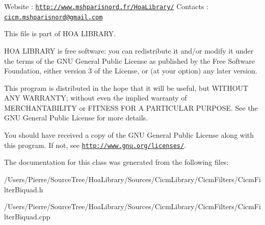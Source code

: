 Website \-: \href{http://www.mshparisnord.fr/HoaLibrary/}{\tt http\-://www.\-mshparisnord.\-fr/\-Hoa\-Library/} Contacts \-: \href{mailto:cicm.mshparisnord@gmail.com}{\tt cicm.\-mshparisnord@gmail.\-com}

This file is part of H\-O\-A L\-I\-B\-R\-A\-R\-Y.

H\-O\-A L\-I\-B\-R\-A\-R\-Y is free software\-: you can redistribute it and/or modify it under the terms of the G\-N\-U General Public License as published by the Free Software Foundation, either version 3 of the License, or (at your option) any later version.

This program is distributed in the hope that it will be useful, but W\-I\-T\-H\-O\-U\-T A\-N\-Y W\-A\-R\-R\-A\-N\-T\-Y; without even the implied warranty of M\-E\-R\-C\-H\-A\-N\-T\-A\-B\-I\-L\-I\-T\-Y or F\-I\-T\-N\-E\-S\-S F\-O\-R A P\-A\-R\-T\-I\-C\-U\-L\-A\-R P\-U\-R\-P\-O\-S\-E. See the G\-N\-U General Public License for more details.

You should have received a copy of the G\-N\-U General Public License along with this program. If not, see \href{http://www.gnu.org/licenses/}{\tt http\-://www.\-gnu.\-org/licenses/}. 

The documentation for this class was generated from the following files\-:\begin{DoxyCompactItemize}
\item 
/\-Users/\-Pierre/\-Source\-Tree/\-Hoa\-Library/\-Sources/\-Cicm\-Library/\-Cicm\-Filters/Cicm\-Filter\-Biquad.\-h\item 
/\-Users/\-Pierre/\-Source\-Tree/\-Hoa\-Library/\-Sources/\-Cicm\-Library/\-Cicm\-Filters/Cicm\-Filter\-Biquad.\-cpp\end{DoxyCompactItemize}
